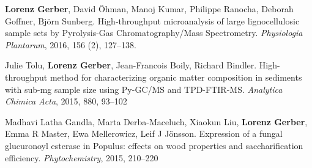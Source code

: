 \documentclass[10pt]{article}
\begin{document}
\begin{bibenum}
                                                                                           \item \textbf{Lorenz Gerber}, David \"{O}hman, Manoj Kumar, Philippe
                                                                                             Ranocha, Deborah Goffner, Bj\"{o}rn Sunberg. High-throughput
                                                                                             microanalysis of large lignocellulosic sample sets by
                                                                                             Pyrolysis-Gas Chromatography/Mass
                                                                                             Spectrometry. \textit{Physiologia Plantarum},
                                                                                             2016, 156 (2), 127--138.


                                                                                           \item Julie Tolu, \textbf{Lorenz Gerber}, Jean-Francois Boily,
                                                                                             Richard Bindler. High-throughput method for characterizing
                                                                                             organic matter composition in sediments with sub-mg sample
                                                                                             size using Py-GC/MS and TPD-FTIR-MS. \textit{Analytica Chimica
                                                                                               Acta}, 2015, 880, 93--102\\


                                                                                           \item Madhavi Latha Gandla, Marta Derba-Maceluch, Xiaokun
                                                                                             Liu, \textbf{Lorenz Gerber}, Emma R Master, Ewa Mellerowicz, Leif J
                                                                                             J\"{o}nsson. Expression of a fungal glucuronoyl esterase in Populus:
                                                                                             effects on wood properties and saccharification efficiency.
                                                                                             \textit{Phytochemistry}, 2015, 210--220\\



\end{bibenum}
\end{document}

